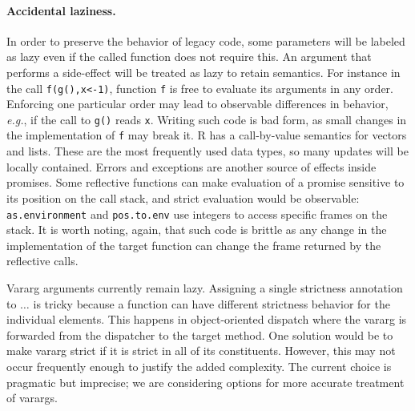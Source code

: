 \documentclass[review,nonacm,screen,acmsmall,anonymous=true]{acmart}
\newcommand{\code}[1]{\lstinline |#1|\xspace}
\renewcommand{\c}[1]{\lstinline |#1|\xspace}
\newcommand{\eg}{\emph{e.g.},\xspace}
\begin{document}
\paragraph{Accidental laziness.} In order to preserve the behavior of legacy
code, some parameters will be labeled as lazy even if the called function does
not require this. An argument that performs a side-effect will be treated as
lazy to retain semantics. For instance in the call \c{f(g(),x<-1)}, function \c
f is free to evaluate its arguments in any order. Enforcing one particular order
may lead to observable differences in behavior, \eg if the call to \c{g()} reads
\c{x}. Writing such code is bad form, as small changes in the implementation of
\c f may break it. R has a call-by-value semantics for vectors and lists. These
are the most frequently used data types, so many updates will be locally
contained. Errors and exceptions are another source of effects inside promises.
Some reflective functions can make evaluation of a promise sensitive to its
position on the call stack, and strict evaluation would be observable:
\code{as.environment} and \code{pos.to.env} use integers to access specific
frames on the stack. It is worth noting, again, that such code is brittle as any
change in the implementation of the target function can change the frame
returned by the reflective calls.

Vararg arguments currently remain lazy. Assigning a single strictness annotation
to $\dots$ is tricky because a function can have different strictness behavior
for the individual elements. This happens in object-oriented dispatch where the
vararg is forwarded from the dispatcher to the target method. One solution would
be to make vararg strict if it is strict in all of its constituents. However,
this may not occur frequently enough to justify the added complexity. The
current choice is pragmatic but imprecise; we are considering options for more
accurate treatment of varargs.
\end{document}
